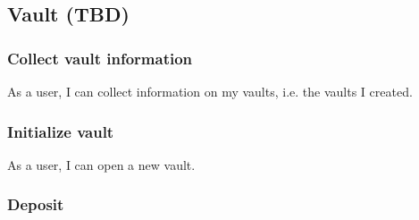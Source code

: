 \documentclass{article} %
\begin{document}
% 
% 
% 
% 
% 
% 
% 
% 
% 
% 
\subsection{Vault (TBD)}

\subsubsection{Collect vault information}

As a user, I can collect information on my vaults, i.e. the vaults I created.

\subsubsection{Initialize vault}

As a user, I can open a new vault.

\subsubsection{Deposit}
\end{document}
